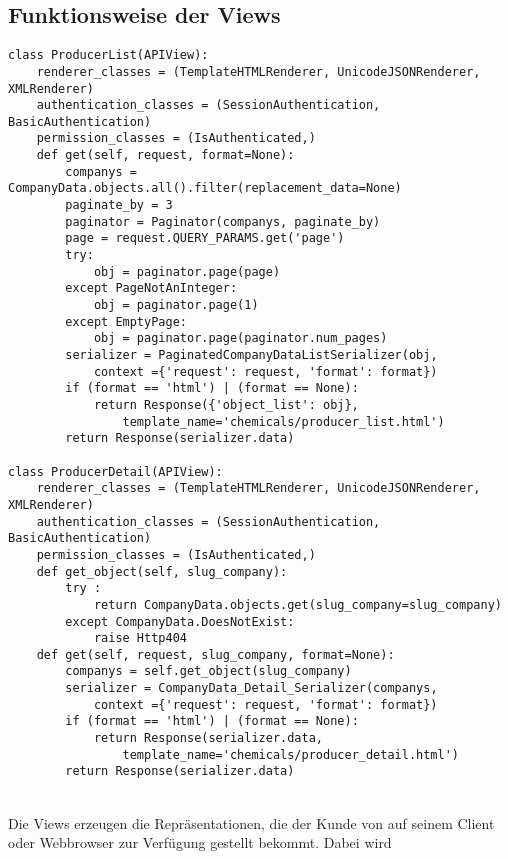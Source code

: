 \subsection{Funktionsweise der Views}
\label{sec:views}

\begin{lstlisting}[caption={View-Klassen zur Bearbeitung von Anfragen an das
System und zum Erstellen der entsprechenden Antworten (Ressource: Producer)
}, label=lst:view,captionpos=b] 
class ProducerList(APIView):
    renderer_classes = (TemplateHTMLRenderer, UnicodeJSONRenderer, XMLRenderer)  
    authentication_classes = (SessionAuthentication, BasicAuthentication)
    permission_classes = (IsAuthenticated,)
    def get(self, request, format=None):
        companys = CompanyData.objects.all().filter(replacement_data=None)
        paginate_by = 3
        paginator = Paginator(companys, paginate_by)
        page = request.QUERY_PARAMS.get('page')
        try:
            obj = paginator.page(page)
        except PageNotAnInteger:
            obj = paginator.page(1)
        except EmptyPage:
            obj = paginator.page(paginator.num_pages)
        serializer = PaginatedCompanyDataListSerializer(obj, 
            context ={'request': request, 'format': format})
        if (format == 'html') | (format == None):
            return Response({'object_list': obj}, 
                template_name='chemicals/producer_list.html')
        return Response(serializer.data)

class ProducerDetail(APIView):
    renderer_classes = (TemplateHTMLRenderer, UnicodeJSONRenderer, XMLRenderer)  
    authentication_classes = (SessionAuthentication, BasicAuthentication)
    permission_classes = (IsAuthenticated,)
    def get_object(self, slug_company):
        try :
            return CompanyData.objects.get(slug_company=slug_company)
        except CompanyData.DoesNotExist:
            raise Http404
    def get(self, request, slug_company, format=None):
        companys = self.get_object(slug_company)
        serializer = CompanyData_Detail_Serializer(companys, 
            context ={'request': request, 'format': format})
        if (format == 'html') | (format == None):
            return Response(serializer.data, 
                template_name='chemicals/producer_detail.html')
        return Response(serializer.data)
\end{lstlisting}
\\
Die Views erzeugen die Repräsentationen, die der Kunde von  auf
seinem Client oder Webbrowser zur Verfügung gestellt bekommt. Dabei wird

